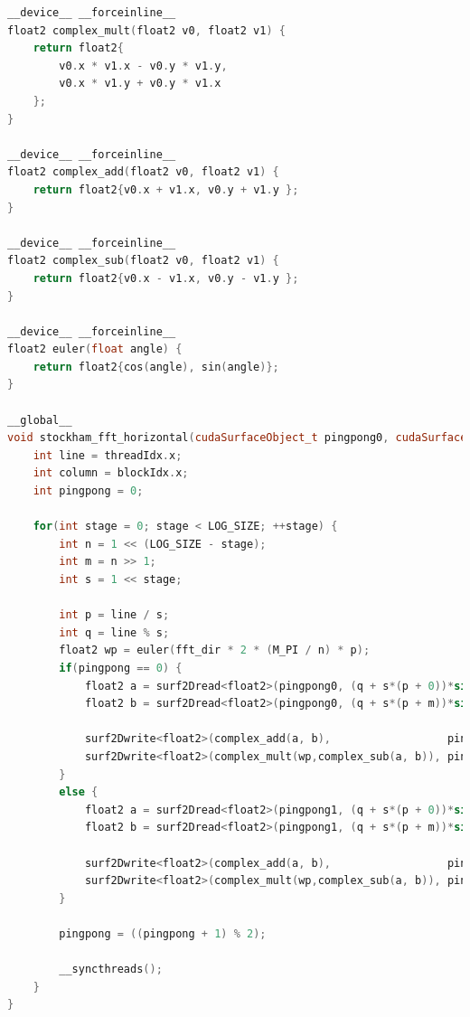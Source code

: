 \documentclass[
  oneside,
  11pt, a4paper,
  footinclude=true,
  headinclude=true,
  cleardoublepage=empty
]{scrbook}
\begin{document}
\begin{lstlisting}[language=C++,caption={FFT Radix-2 Stockham, see \autoref{sec:implementation-analysis-in-cuda}},label={lst:cuda-radix2-stockham}]
__device__ __forceinline__
float2 complex_mult(float2 v0, float2 v1) {
    return float2{
        v0.x * v1.x - v0.y * v1.y,
        v0.x * v1.y + v0.y * v1.x
    };
}

__device__ __forceinline__
float2 complex_add(float2 v0, float2 v1) {
    return float2{v0.x + v1.x, v0.y + v1.y };
}

__device__ __forceinline__
float2 complex_sub(float2 v0, float2 v1) {
    return float2{v0.x - v1.x, v0.y - v1.y };
}

__device__ __forceinline__
float2 euler(float angle) {
    return float2{cos(angle), sin(angle)};
}

__global__
void stockham_fft_horizontal(cudaSurfaceObject_t pingpong0, cudaSurfaceObject_t pingpong1, float fft_dir) {
    int line = threadIdx.x;
    int column = blockIdx.x;
    int pingpong = 0;

    for(int stage = 0; stage < LOG_SIZE; ++stage) {
        int n = 1 << (LOG_SIZE - stage);
        int m = n >> 1;
        int s = 1 << stage;

        int p = line / s;
        int q = line % s;
        float2 wp = euler(fft_dir * 2 * (M_PI / n) * p);
        if(pingpong == 0) {
            float2 a = surf2Dread<float2>(pingpong0, (q + s*(p + 0))*sizeof(float2), column);
            float2 b = surf2Dread<float2>(pingpong0, (q + s*(p + m))*sizeof(float2), column);

            surf2Dwrite<float2>(complex_add(a, b),                  pingpong1, (q + s*(2*p + 0))*sizeof(float2), column);
            surf2Dwrite<float2>(complex_mult(wp,complex_sub(a, b)), pingpong1, (q + s*(2*p + 1))*sizeof(float2), column);
        }
        else {
            float2 a = surf2Dread<float2>(pingpong1, (q + s*(p + 0))*sizeof(float2), column);
            float2 b = surf2Dread<float2>(pingpong1, (q + s*(p + m))*sizeof(float2), column);

            surf2Dwrite<float2>(complex_add(a, b),                  pingpong0, (q + s*(2*p + 0))*sizeof(float2), column);
            surf2Dwrite<float2>(complex_mult(wp,complex_sub(a, b)), pingpong0, (q + s*(2*p + 1))*sizeof(float2), column);
        }

        pingpong = ((pingpong + 1) % 2);

        __syncthreads();
    }
}



\end{lstlisting}
\end{document}
